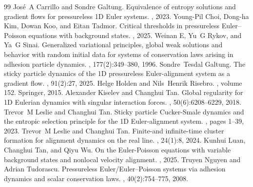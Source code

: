 \documentclass[10pt,a4paper]{amsart}
\begin{document}
\begin{thebibliography}{99}
 Jos{\'e}~A Carrillo and Sondre Galtung. \newblock Equivalence of entropy solutions and gradient flows for pressureless {1D} {E}uler systems. , 2023.
 Young-Pil Choi, Dong-ha Kim, Dowan Koo, and Eitan Tadmor. \newblock Critical thresholds in pressureless {E}uler--{P}oisson equations with background states. , 2025.
 Weinan E, Yu~G Rykov, and Ya~G Sinai. \newblock Generalized variational principles, global weak solutions and behavior with random initial data for systems of conservation laws arising in adhesion particle dynamics. , 177(2):349--380, 1996.
 Sondre~Tesdal Galtung. \newblock The sticky particle dynamics of the {1D} pressureless {E}uler-alignment system as a gradient flow. , 91(2):27, 2025.
 Helge Holden and Nils~Henrik Risebro. , volume 152. \newblock Springer, 2015.
 Alexander Kiselev and Changhui Tan. \newblock Global regularity for {1D} {E}ulerian dynamics with singular interaction forces. , 50(6):6208--6229, 2018.
 Trevor~M Leslie and Changhui Tan. \newblock Sticky particle {C}ucker-{S}male dynamics and the entropic selection principle for the {1D} {E}uler-alignment system. , pages 1--39, 2023.
 Trevor~M Leslie and Changhui Tan. \newblock Finite-and infinite-time cluster formation for alignment dynamics on the real line. , 24(1):8, 2024.
 Kunhui Luan, Changhui Tan, and Qiyu Wu. \newblock On the {E}uler-{P}oisson equations with variable background states and nonlocal velocity alignment. , 2025.
 Truyen Nguyen and Adrian Tudorascu. \newblock Pressureless {E}uler/{E}uler--{P}oisson systems via adhesion dynamics and scalar conservation laws. , 40(2):754--775, 2008.
\end{thebibliography}
\end{document}
